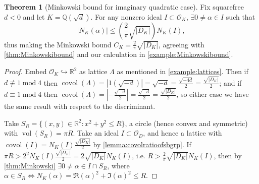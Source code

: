 \documentclass{article}
\newcommand{\Q}{\mathbb{Q}}
\newcommand{\R}{\mathbb{R}}
\newcommand{\Mod}{\operatorname{mod}}
\newcommand{\vol}{\operatorname{vol}}
\newcommand{\covol}{\operatorname{covol}}
\newcommand{\ri}{\mathcal{O}}
\theoremstyle{definition}
\newtheorem{thm}[defn]{Theorem}
\begin{document}
\begin{thm}[Minkowski bound for imaginary quadratic case]
Fix squarefree $d<0$ and let $K=\Q\left(\sqrt d\right)$. For any nonzero ideal $I\subset\ri_K$, $\exists 0\neq\alpha\in I$ such that
\[
|N_K(\alpha)|\leq\left(\frac{2}{\pi}\sqrt{|D_K|}\right)N_K(I),
\]
thus making the Minkowski bound $C_K=\frac{2}{\pi}\sqrt{|D_K|}$, agreeing with \ref{thm:Minkowskibound} and our calculation in \ref{example:Minkowskibound}.
\end{thm}
\begin{proof}
Embed $\ri_K\hookrightarrow\R^2$ as lattice $\Lambda$ as mentioned in \ref{example:lattices}. Then if $d\nequiv 1\Mod 4$ then $\covol(\Lambda)=|1(\sqrt{-d})|=\sqrt{-d}=\frac{\sqrt{-4d}}{2}=\frac{\sqrt{|D_K|}}{2}$; and if $d\equiv 1\Mod 4$ then $\covol(\Lambda)=\left|-\frac{\sqrt{-d}}{2}\right|=\frac{\sqrt{-d}}{2}=\frac{\sqrt{|D_K|}}{2}$, so either case we have the same result with respect to the discriminant.

Take $S_R=\{(x,y)\in\R^2:x^2+y^2\leq R\}$, a circle (hence convex and symmetric) with $\vol(S_R)=\pi R$. Take an ideal $I\subset\ri_D$, and hence a lattice with $\covol(I)=N_K(I)\frac{\sqrt{|D_K|}}{2}$ by \ref{lemma:covolratioofsbgrp}. If $\pi R>2^2N_K(I)\frac{\sqrt{|D_K|}}{2}=2\sqrt{|D_K|}N_K(I)$, i.e. $R>\frac{2}{\pi}\sqrt{|D_K|}N_K(I)$, then by \ref{thm:Minkowski} $\exists 0\neq\alpha\in I\cap S_R$, where $\alpha\in S_R\iff N_K(\alpha)=\Re(\alpha)^2+\Im(\alpha)^2\leq R$.
\end{proof}
\end{document}

